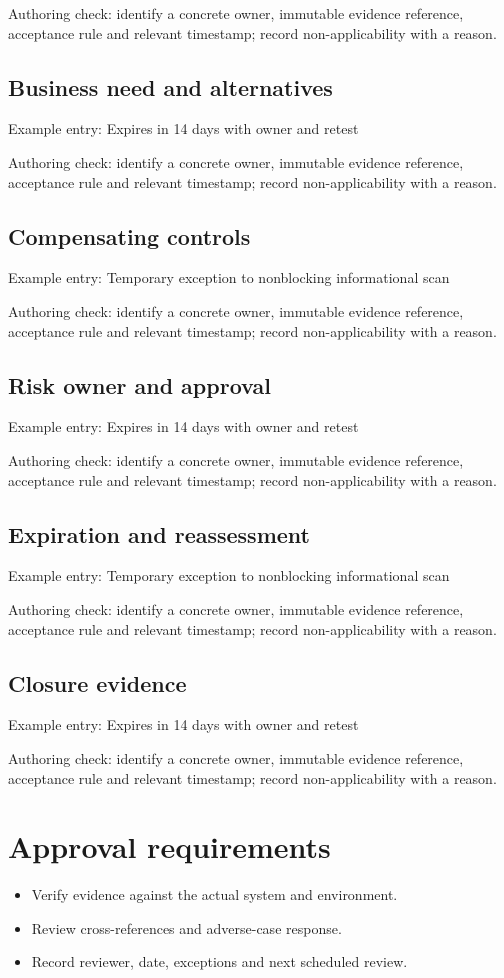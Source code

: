 \documentclass[10pt,letterpaper]{article}
\begin{document}
Authoring check: identify a concrete owner, immutable evidence reference, acceptance rule and relevant timestamp; record non-applicability with a reason.


\subsection{Business need and alternatives}
Example entry: Expires in 14 days with owner and retest

Authoring check: identify a concrete owner, immutable evidence reference, acceptance rule and relevant timestamp; record non-applicability with a reason.


\subsection{Compensating controls}
Example entry: Temporary exception to nonblocking informational scan

Authoring check: identify a concrete owner, immutable evidence reference, acceptance rule and relevant timestamp; record non-applicability with a reason.


\subsection{Risk owner and approval}
Example entry: Expires in 14 days with owner and retest

Authoring check: identify a concrete owner, immutable evidence reference, acceptance rule and relevant timestamp; record non-applicability with a reason.


\subsection{Expiration and reassessment}
Example entry: Temporary exception to nonblocking informational scan

Authoring check: identify a concrete owner, immutable evidence reference, acceptance rule and relevant timestamp; record non-applicability with a reason.


\subsection{Closure evidence}
Example entry: Expires in 14 days with owner and retest

Authoring check: identify a concrete owner, immutable evidence reference, acceptance rule and relevant timestamp; record non-applicability with a reason.


\section{Approval requirements}
\begin{itemize}
\item Verify evidence against the actual system and environment.
\item Review cross-references and adverse-case response.
\item Record reviewer, date, exceptions and next scheduled review.
\end{itemize}
\end{document}
